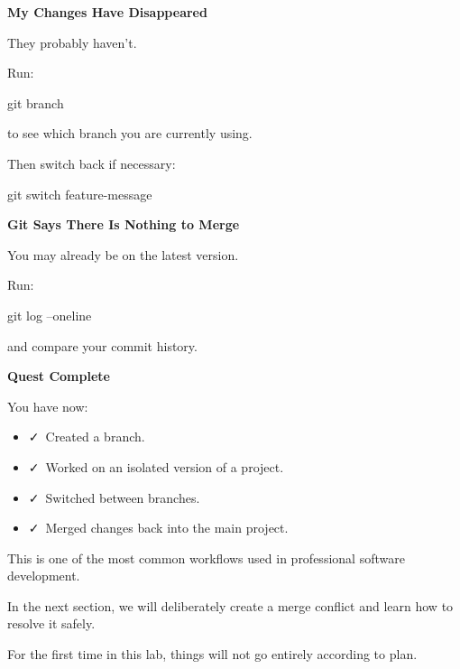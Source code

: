 \documentclass{csc2059practical}
\begin{document}
\begin{commonerror}
\textbf{My Changes Have Disappeared}\par
\medskip

They probably haven't.


Run:


\begin{terminalplain}
  git branch
\end{terminalplain}
to see which branch you are currently using.

Then switch back if necessary:

\begin{terminalplain}
  git switch feature-message
\end{terminalplain}
\end{commonerror}
\begin{commonerror}
\textbf{Git Says There Is Nothing to Merge}\par
\medskip

You may already be on the latest version.


Run:


\begin{terminalplain}
  git log --oneline
\end{terminalplain}
and compare your commit history.
\end{commonerror}

\begin{wrapupbox}
\textbf{Quest Complete}\par
\medskip

You have now:


\begin{itemize}
  \item \faCheck\ Created a branch.
\end{itemize}

\begin{itemize}
  \item \faCheck\ Worked on an isolated version of a project.
\end{itemize}

\begin{itemize}
  \item \faCheck\ Switched between branches.
\end{itemize}

\begin{itemize}
  \item \faCheck\ Merged changes back into the main project.
\end{itemize}

This is one of the most common workflows used in professional software development.


In the next section, we will deliberately create a merge conflict and learn how to resolve it safely.


For the first time in this lab, things will not go entirely according to plan.


\end{wrapupbox}
\end{document}
